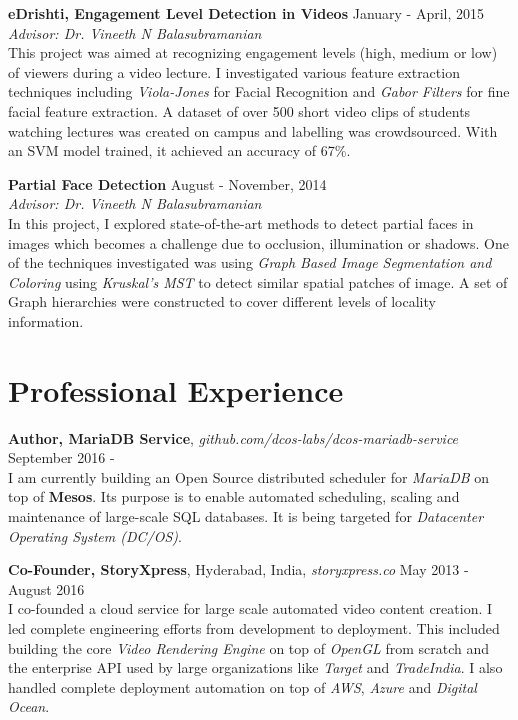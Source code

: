 \documentclass[margin,line]{res}
\begin{document}
\begin{resume}
  \vspace*{-2.5mm}

  {\bf eDrishti, Engagement Level Detection in Videos} \hfill January - April, 2015 \\
  	{\em Advisor: Dr. Vineeth N Balasubramanian} \\
  	This project was aimed at recognizing engagement levels (high, medium or low) of viewers during a video lecture. I investigated various feature extraction techniques including {\it Viola-Jones} for Facial Recognition and {\it Gabor Filters} for fine facial feature extraction. A dataset of over 500 short video clips of students watching lectures was created on campus and labelling was crowdsourced. With an SVM model trained, it achieved an accuracy of 67\%.

  \vspace*{-2.5mm}

  {\bf Partial Face Detection} \hfill August - November, 2014 \\
  	{\em Advisor: Dr. Vineeth N Balasubramanian} \\
    In this project, I explored state-of-the-art methods to detect partial faces in images which becomes a challenge due to occlusion, illumination or shadows. One of the techniques investigated was using {\it Graph Based Image Segmentation and Coloring} using {\it Kruskal's MST} to detect similar spatial patches of image. A set of Graph hierarchies were constructed to cover different levels of locality information.

\section{\sc Professional Experience}

  {\bf Author, MariaDB Service}, {\it github.com/dcos-labs/dcos-mariadb-service} \hfill September 2016 - \\
    I am currently building an Open Source distributed scheduler for {\it MariaDB} on top of {\bf Mesos}. Its purpose is to enable automated scheduling, scaling and maintenance of large-scale SQL databases. It is being targeted for {\it Datacenter Operating System (DC/OS)}.

  \vspace*{-2.5mm}

  {\bf Co-Founder, StoryXpress}, Hyderabad, India, {\it storyxpress.co}  \hfill May 2013 - August 2016 \\
    I co-founded a cloud service for large scale automated video content creation. I led complete engineering efforts from development to deployment. This included building the core {\it Video Rendering Engine} on top of {\it OpenGL} from scratch and the enterprise API used by large organizations like {\it Target} and {\it TradeIndia}. I also handled complete deployment automation on top of {\it AWS}, {\it Azure} and {\it Digital Ocean}.


\end{resume}
\end{document}
